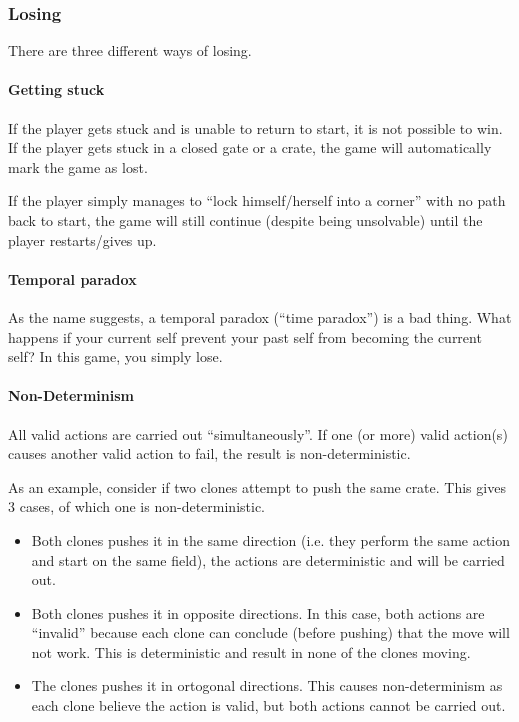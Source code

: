 \subsubsection{Losing}

There are three different ways of losing.

\paragraph{Getting stuck}
If the player gets stuck and is unable to return to start, it is not
possible to win.  If the player gets stuck in a closed gate or a
crate, the game will automatically mark the game as lost.

If the player simply manages to ``lock himself/herself into a corner''
with no path back to start, the game will still continue (despite being
unsolvable) until the player restarts/gives up.

\paragraph{Temporal paradox}
As the name suggests, a temporal paradox (``time paradox'') is a bad
thing.  What happens if your current self prevent your past self from
becoming the current self?  In this game, you simply lose.

\paragraph{Non-Determinism}
All valid actions are carried out ``simultaneously''.  If one (or
more) valid action(s) causes another valid action to fail, the result
is non-deterministic.

As an example, consider if two clones attempt to push the same
crate.  This gives 3 cases, of which one is non-deterministic.

\begin{itemize}
\item Both clones pushes it in the same direction (i.e. they perform
  the same action and start on the same field), the actions are
  deterministic and will be carried out.
\item Both clones pushes it in opposite directions.  In this case,
  both actions are ``invalid'' because each clone can conclude (before
  pushing) that the move will not work.  This is deterministic and
  result in none of the clones moving.
\item The clones pushes it in ortogonal directions.  This causes
  non-determinism as each clone believe the action is valid, but
  both actions cannot be carried out.
\end{itemize}

